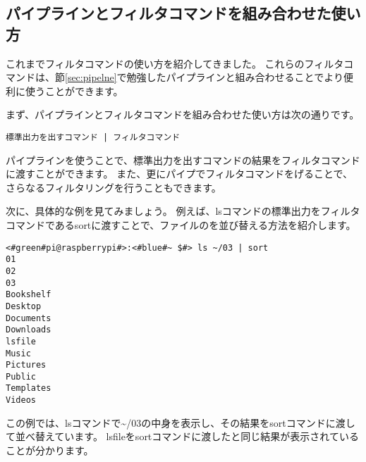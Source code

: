 \subsection{パイプラインとフィルタコマンドを組み合わせた使い方}
これまでフィルタコマンドの使い方を紹介してきました。
これらのフィルタコマンドは、節\ref{sec:pipelne}で勉強したパイプラインと組み合わせることでより便利に使うことができます。

まず、パイプラインとフィルタコマンドを組み合わせた使い方は次の通りです。

\begin{lstlisting}[caption=パイプラインを用いたフィルタコマンドの実行例, label=pipeline_filter]
標準出力を出すコマンド | フィルタコマンド
\end{lstlisting}

パイプラインを使うことで、標準出力を出すコマンドの結果をフィルタコマンドに渡すことができます。
また、更にパイプでフィルタコマンドをげることで、さらなるフィルタリングを行うこともできます。

次に、具体的な例を見てみましょう。
例えば、lsコマンドの標準出力をフィルタコマンドであるsortに渡すことで、ファイルのを並び替える方法を紹介します。

\begin{lstlisting}[caption=パイプラインを用いたsortコマンドの実行例, label=sort_example]
<#green#pi@raspberrypi#>:<#blue#~ $#> ls ~/03 | sort
01
02
03
Bookshelf
Desktop
Documents
Downloads
lsfile
Music
Pictures
Public
Templates
Videos
\end{lstlisting}

この例では、lsコマンドで\textasciitilde/03の中身を表示し、その結果をsortコマンドに渡して並べ替えています。
lsfileをsortコマンドに渡したと同じ結果が表示されていることが分かります。


